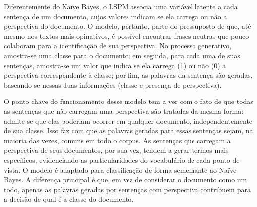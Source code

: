 
Diferentemente do Naïve Bayes, o LSPM associa uma variável latente a cada sentença de um documento, cujos valores indicam se ela carrega ou não a perspectiva do documento. O modelo, portanto, parte do pressuposto de que, até mesmo nos textos mais opinativos, é possível encontrar frases neutras que pouco colaboram para a identificação de sua perspectiva. No processo generativo, amostra-se uma classe para o documento; em seguida, para cada uma de suas sentenças, amostra-se um valor que indica se ela carrega (1) ou não (0) a perspectiva correspondente à classe; por fim, as palavras da sentença são geradas, baseando-se nessas duas informações (classe e presença de perspectiva).

O ponto chave do funcionamento desse modelo tem a ver com o fato de que todas as sentenças que não carregam uma perspectiva são tratadas da mesma forma: admite-se que elas poderiam ocorrer em qualquer documento, independentemente de sua classe. Isso faz com que as palavras geradas para essas sentenças sejam, na maioria das vezes, comuns em todo o corpus. As sentenças que carregam a perspectiva de seus documentos, por sua vez, tendem a gerar termos mais específicos, evidenciando as particularidades do vocabulário de cada ponto de vista. O modelo é adaptado para classificação de forma semelhante ao Naïve Bayes. A diferença principal é que, em vez de considerar o documento como um todo, apenas as palavras geradas por sentenças com perspectiva contribuem para a decisão de qual é a classe do documento. %


